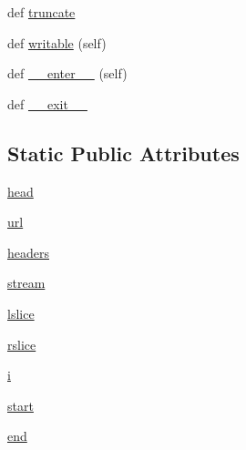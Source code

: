 \begin{DoxyCompactItemize}
\item 
def \hyperlink{classpip_1_1__internal_1_1network_1_1lazy__wheel_1_1LazyZipOverHTTP_a41656b039756c74cca611be96e575257}{truncate}
\item 
def \hyperlink{classpip_1_1__internal_1_1network_1_1lazy__wheel_1_1LazyZipOverHTTP_ae7fb692fbe63c970909f32ed9a146a16}{writable} (self)
\item 
def \hyperlink{classpip_1_1__internal_1_1network_1_1lazy__wheel_1_1LazyZipOverHTTP_a8128c79848030828bbb0efee9c0a6a87}{\+\_\+\+\_\+enter\+\_\+\+\_\+} (self)
\item 
def \hyperlink{classpip_1_1__internal_1_1network_1_1lazy__wheel_1_1LazyZipOverHTTP_a3efe39be9900dce3da679a7a76f4f833}{\+\_\+\+\_\+exit\+\_\+\+\_\+}
\end{DoxyCompactItemize}
\subsection*{Static Public Attributes}
\begin{DoxyCompactItemize}
\item 
\hyperlink{classpip_1_1__internal_1_1network_1_1lazy__wheel_1_1LazyZipOverHTTP_a6013617ef0c88ae4a0754eacd76bd595}{head}
\item 
\hyperlink{classpip_1_1__internal_1_1network_1_1lazy__wheel_1_1LazyZipOverHTTP_a10dc0ea7eff7e275b23b757236ef7c83}{url}
\item 
\hyperlink{classpip_1_1__internal_1_1network_1_1lazy__wheel_1_1LazyZipOverHTTP_a057a177056dde70bde3e6cab72b11c0c}{headers}
\item 
\hyperlink{classpip_1_1__internal_1_1network_1_1lazy__wheel_1_1LazyZipOverHTTP_ae73ae31fcfae52fe73a1e9478bb567f3}{stream}
\item 
\hyperlink{classpip_1_1__internal_1_1network_1_1lazy__wheel_1_1LazyZipOverHTTP_a40b591efb41b4fd93364aedb64d509c9}{lslice}
\item 
\hyperlink{classpip_1_1__internal_1_1network_1_1lazy__wheel_1_1LazyZipOverHTTP_a8c13cc913800f6b0523d3c7de13bc283}{rslice}
\item 
\hyperlink{classpip_1_1__internal_1_1network_1_1lazy__wheel_1_1LazyZipOverHTTP_a82bb6b57e3f47ef02ed655a34c59e5c0}{i}
\item 
\hyperlink{classpip_1_1__internal_1_1network_1_1lazy__wheel_1_1LazyZipOverHTTP_a114c0babfbf14a43a66734c489b667e9}{start}
\item 
\hyperlink{classpip_1_1__internal_1_1network_1_1lazy__wheel_1_1LazyZipOverHTTP_a23163e2ac94132e179421e781db7eb95}{end}
\end{DoxyCompactItemize}


